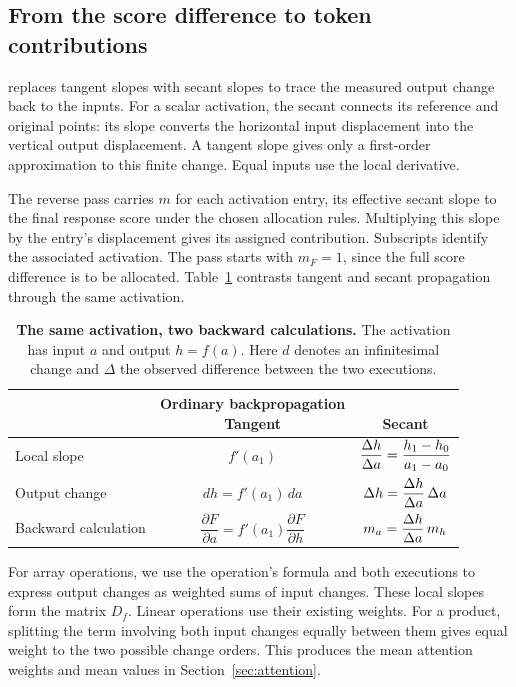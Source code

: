 \subsection{From the score difference to token contributions}
\label{sec:reverse}
\dt{} replaces tangent slopes with secant slopes to trace the measured output change back to the inputs. For a scalar activation, the secant connects its reference and original points: its slope converts the horizontal input displacement into the vertical output displacement. A tangent slope gives only a first-order approximation to this finite change. Equal inputs use the local derivative.

The reverse pass carries $m$ for each activation entry, its effective secant slope to the final response score under the chosen allocation rules. Multiplying this slope by the entry's displacement gives its assigned contribution. Subscripts identify the associated activation. The pass starts with $m_F=1$, since the full score difference is to be allocated. Table~\ref{tab:reverse-comparison} contrasts tangent and secant propagation through the same activation.

\begin{table}[htbp]
\centering
\small
\caption{\textbf{The same activation, two backward calculations.} The activation has input $a$ and output $h=f(a)$. Here $d$ denotes an infinitesimal change and $\Delta$ the observed difference between the two executions.}
\label{tab:reverse-comparison}
\renewcommand{\arraystretch}{1.35}
\begin{tabular}{@{}lcc@{}}
\toprule
 & \shortstack{Ordinary backpropagation\\Tangent} & \shortstack{\dt{}\\Secant} \\
\midrule
Local slope & $f'(a_1)$ & $\dfrac{\Delta h}{\Delta a}=\dfrac{h_1-h_0}{a_1-a_0}$ \\
\addlinespace[3pt]
Output change & $dh=f'(a_1)\,da$ & $\Delta h=\dfrac{\Delta h}{\Delta a}\,\Delta a$ \\
\addlinespace[3pt]
Backward calculation & $\dfrac{\partial F}{\partial a}=f'(a_1)\dfrac{\partial F}{\partial h}$ & $m_a=\dfrac{\Delta h}{\Delta a}\,m_h$ \\
\bottomrule
\end{tabular}
\end{table}

For array operations, we use the operation's formula and both executions to express output changes as weighted sums of input changes. These local slopes form the matrix $D_f$. Linear operations use their existing weights. For a product, splitting the term involving both input changes equally between them gives equal weight to the two possible change orders. This produces the mean attention weights and mean values in Section~\ref{sec:attention}.

